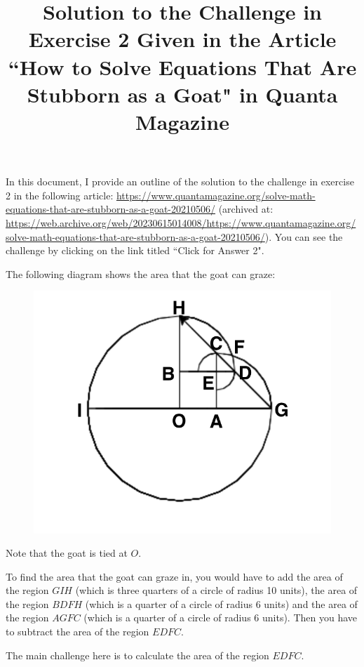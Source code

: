 \documentclass{article}
\date{}
\title{Solution to the Challenge in Exercise 2 Given in the Article ``How to Solve Equations That Are Stubborn as a Goat" in Quanta Magazine}
\begin{document}
\maketitle

In this document, I provide an outline of the solution to the challenge in exercise 2 in the following article: \url{https://www.quantamagazine.org/solve-math-equations-that-are-stubborn-as-a-goat-20210506/} (archived at: \url{https://web.archive.org/web/20230615014008/https://www.quantamagazine.org/solve-math-equations-that-are-stubborn-as-a-goat-20210506/}). You can see the challenge by clicking on the link titled ``Click for Answer 2".

The following diagram shows the area that the goat can graze:

\begin{figure}[h]
\includegraphics{grazing-area-challenge-exercise-2-quanta-rotated}
\centering
\end{figure}

Note that the goat is tied at $O$.

To find the area that the goat can graze in, you would have to add the area of the region $GIH$ (which is three quarters of a circle of radius 10 units), the area of the region $BDFH$ (which is a quarter of a circle of radius 6 units) and the area of the region $AGFC$ (which is a quarter of a circle of radius 6 units). Then you have to subtract the area of the region $EDFC$.

The main challenge here is to calculate the area of the region $EDFC$.
\end{document}

